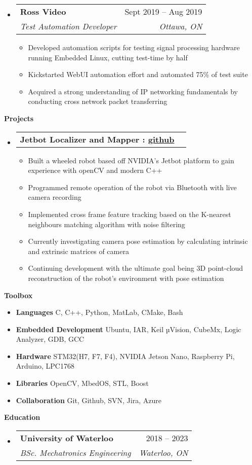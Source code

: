 \documentclass[letterpaper,12pt]{article}[leftmargin=*]
\makeatletter
\def \entryspacing {-0pt}
\renewcommand{\section}[2]{\vspace{5pt}
  \colorbox{secondary}{\color{white}\raggedbottom\normalsize\textbf{{#1}{\hspace{7pt}#2}}}
}
\newcommand{\resumeEntryStart}{\begin{itemize}[leftmargin=2.5mm]}
\newcommand{\resumeEntryEnd}{\end{itemize}\vspace{\entryspacing}}
\newcommand{\resumeItemListStart}{\begin{itemize}[leftmargin=4.5mm]}
\newcommand{\resumeItemListEnd}{\end{itemize}}
\newcommand{\resumeItem}[1]{
  \item\small{
    {#1 \vspace{-2pt}}
  }
}
\newcommand{\resumeEntryTSDL}[4]{
  \vspace{-1pt}\item[]
    \begin{tabularx}{0.97\textwidth}{X@{\hspace{60pt}}r}
      \textbf{\color{primary}#1} & {\firabook\color{accent}\small#2} \\
      \textit{\color{accent}\small#3} & \textit{\color{accent}\small#4} \\
    \end{tabularx}\vspace{-6pt}
}
\newcommand{\resumeEntryTD}[2]{
  \vspace{-1pt}\item[]
    \begin{tabularx}{0.97\textwidth}{X@{\hspace{60pt}}r}
      \textbf{\color{primary}#1} & {\firabook\color{accent}\small#2} \\
    \end{tabularx}\vspace{-6pt}
}
\newcommand{\resumeEntryS}[2]{
  \item[]\small{
    \textbf{\color{primary}#1 }{ #2 \vspace{-6pt}}
  }
}
\makeatother
\begin{document}
  \resumeEntryStart
    \resumeEntryTSDL
      {Ross Video}{Sept 2019 -- Aug 2019}
      {Test Automation Developer}{Ottawa, ON}
    \resumeItemListStart
        \resumeItem {Developed automation scripts for testing signal processing hardware running Embedded Linux, cutting test-time by half}
        \resumeItem {Kickstarted WebUI automation effort and automated 75\% of test suite}
        \resumeItem {Acquired a strong understanding of IP networking fundamentals by conducting cross network packet transferring}
    \resumeItemListEnd
  \resumeEntryEnd

\section{\faFlask}{Projects}

  \resumeEntryStart
    \resumeEntryTD
      {Jetbot Localizer and Mapper : \href{https://github.com/younesr1/jetbot_slam}{github}}{}
    \resumeItemListStart
      \resumeItem {Built a wheeled robot based off NVIDIA's Jetbot platform to gain experience with openCV and modern C++}
      \resumeItem {Programmed remote operation  of the robot via Bluetooth with live camera recording}
      \resumeItem {Implemented cross frame feature tracking based on the K-nearest neighbours matching algorithm with noise filtering}
      \resumeItem {Currently investigating camera pose estimation by calculating intrinsic and extrinsic matrices of camera}
      \resumeItem {Continuing development with the ultimate goal being 3D point-cloud reconstruction of the robot's environment with pose estimation}
    \resumeItemListEnd
  \resumeEntryEnd

\section{\faGears}{Toolbox}
 \resumeEntryStart
  \resumeEntryS{Languages } {C, C++, Python, MatLab, CMake, Bash}
  \resumeEntryS{Embedded Development} {Ubuntu, IAR, Keil µVision, CubeMx, Logic Analyzer, GDB, GCC}
  \resumeEntryS{Hardware} {STM32(H7, F7, F4), NVIDIA Jetson Nano, Raspberry Pi, Arduino, LPC1768}
  \resumeEntryS{Libraries } {OpenCV, MbedOS, STL, Boost}
  \resumeEntryS{Collaboration } {Git, Github, SVN, Jira, Azure}
 \resumeEntryEnd

\section{\faGraduationCap}{Education}
  \resumeEntryStart
    \resumeEntryTSDL
      {University of Waterloo}{2018 -- 2023}
      {BSc. Mechatronics Engineering}{Waterloo, ON}
  \resumeEntryEnd
\end{document}

